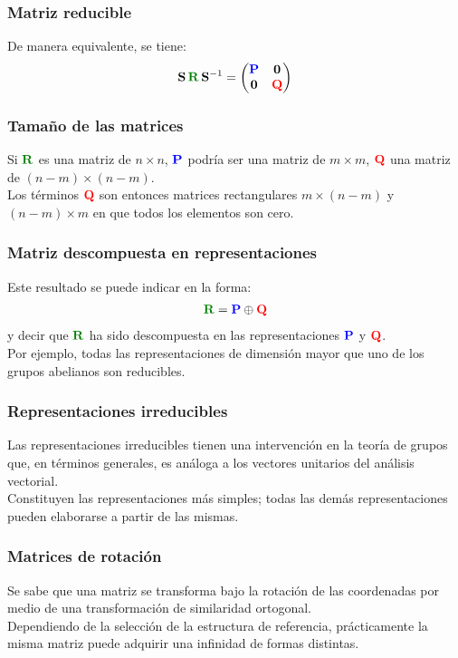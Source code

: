 \documentclass[12pt]{beamer}
\begin{document}
\begin{frame}
\frametitle{Matriz reducible}
De manera equivalente, se tiene:
\begin{align}
\vb{S} \, \textcolor{ao}{\vb{R}} \, \vb{S}^{-1} = \mqty( 
\textcolor{blue}{\vb{P}} & \vb{0} \\
\vb{0} & \textcolor{red}{\vb{Q}} )
\label{eq:ecuacion_04_187}
\end{align}
\end{frame}
\begin{frame}
\frametitle{Tamaño de las matrices}
Si $\textcolor{ao}{\vb{R}}$ es una matriz de $n \times n$, \pause $\textcolor{blue}{\vb{P}}$ podría ser una matriz de $m \times m$, \pause $\textcolor{red}{\vb{Q}}$ una matriz de $(n-m) \times (n - m)$.
\\
\bigskip
\pause
Los términos $\textcolor{red}{\vb{Q}}$ son entonces matrices rectangulares $m \times (n - m)$ y $(n - m) \times m$ en que todos los elementos son cero.
\end{frame}
\begin{frame}
\frametitle{Matriz descompuesta en representaciones}
Este resultado se puede indicar en la forma:
\pause
\begin{align}
\textcolor{ao}{\vb{R}} = \textcolor{blue}{\vb{P}} \oplus \textcolor{red}{\vb{Q}}
\label{eq:ecuacion_04_188}
\end{align}
\pause
y decir que $\textcolor{ao}{\vb{R}}$ ha sido descompuesta en las representaciones $\textcolor{blue}{\vb{P}}$ y $\textcolor{red}{\vb{Q}}$.
\\
\bigskip
\pause
Por ejemplo, todas las representaciones de dimensión mayor que uno de los grupos abelianos son reducibles. 
\end{frame}
\begin{frame}
\frametitle{Representaciones irreducibles}
Las \textcolor{atomictangerine}{representaciones irreducibles} tienen una intervención en la teoría de grupos que, en términos generales, es análoga a los vectores unitarios del análisis vectorial.
\\
\bigskip
\pause
Constituyen las representaciones más simples; todas las demás representaciones pueden elaborarse a partir de las mismas.
\end{frame}
\begin{frame}
\frametitle{Matrices de rotación}
Se sabe que una matriz se transforma bajo la rotación de las coordenadas por medio de una transformación de similaridad ortogonal.
\\
\bigskip
\pause
Dependiendo de la selección de la estructura de referencia, prácticamente la misma matriz puede adquirir una infinidad de formas distintas.
\end{frame}
\end{document}
